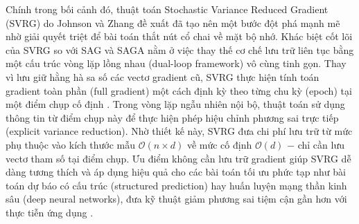 Chính trong bối cảnh đó, thuật toán Stochastic Variance Reduced Gradient (SVRG) do Johnson và Zhang \cite{johnson2013accelerating} đề xuất đã tạo nên một bước đột phá mạnh mẽ nhờ giải quyết triệt để bài toán thắt nút cổ chai về mặt bộ nhớ. Khác biệt cốt lõi của SVRG so với SAG và SAGA nằm ở việc thay thế cơ chế lưu trữ liên tục bằng một cấu trúc vòng lặp lồng nhau (dual-loop framework) vô cùng tinh gọn. Thay vì lưu giữ hằng hà sa số các vectơ gradient cũ, SVRG thực hiện tính toán gradient toàn phần (full gradient) một cách định kỳ theo từng chu kỳ (epoch) tại một điểm chụp cố định \cite{driggs2022accelerating}. Trong vòng lặp ngẫu nhiên nội bộ, thuật toán sử dụng thông tin từ điểm chụp này để thực hiện phép hiệu chỉnh phương sai trực tiếp (explicit variance reduction). Nhờ thiết kế này, SVRG đưa chi phí lưu trữ từ mức phụ thuộc vào kích thước mẫu $\mathcal{O}(n \times d)$ về mức cố định $\mathcal{O}(d)$  $-$ chỉ cần lưu vectơ tham số tại điểm chụp. Ưu điểm không cần lưu trữ gradient giúp SVRG dễ dàng tương thích và áp dụng hiệu quả cho các bài toán tối ưu phức tạp như bài toán dự báo có cấu trúc (structured prediction) hay huấn luyện mạng thần kinh sâu (deep neural networks), đưa kỹ thuật giảm phương sai tiệm cận gần hơn với thực tiễn ứng dụng \cite{johnson2013accelerating}.
